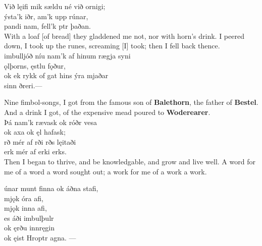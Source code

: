 \bva Við lęifi mik sældu \hld né við ornigi; \\%
ýsta'k iðr, \hld {}am'k upp rúnar, \\%
pandi nam, \hld fell'k ptr þaðan.\\%

\bvb With a loaf [of bread] they gladdened me not, nor with horn's drink. I peered down, I took up the runes, screaming [I] took; then I fell back thence. \\

\bva {}imbulljóð níu \hld nam'k af hinum rægja syni \\%
\ind {}ǫlþorns, ęstlu fǫður, \\%
ok ek rykk of gat \hld hins ýra mjaðar \\%
\ind {}sinn ðreri.\footnotemark[1] —\\%

\bvb Nine fimbol-songs, I got from the famous son of \textbf{Balethorn}, the father of \textbf{Bestel}. And a drink I got, of the expensive mead poured to \textbf{Woderearer}. \\

\bva Þá nam'k rævask \hld ok róðr vesa \\%
\ind ok axa ok ęl hafask; \\%
rð mér af rði \hld {}rðs lęitaði \\%
\ind {}erk mér af erki erks.\\%

\bvb Then I began to thrive, and be knowledgable, and grow and live well. A word for me of a word a word sought out; a work for me of a work a work\footnotemark[10]. \\

\bva {}únar munt finna \hld ok áðna stafi, \\%
\ind mjǫk óra afi, \\%
\ind mjǫk inna afi, \\%
\ind es áði imbulþulr \\%
\ind ok ęrðu innręgin \\%
\ind ok ęist Hroptr agna\footnotemark[5]. —\\%

